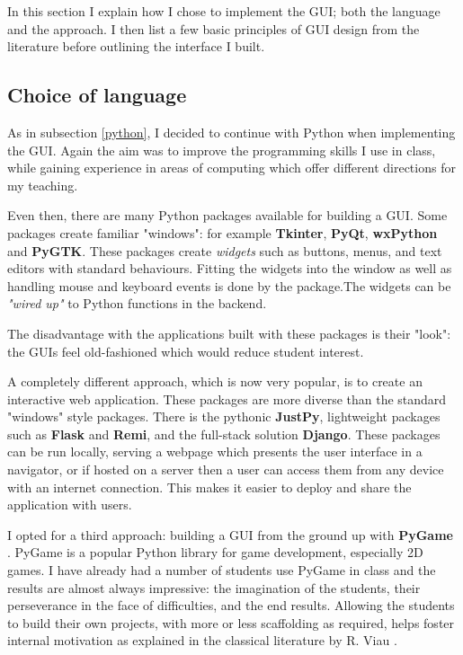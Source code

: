 \documentclass[10pt]{article}
\begin{document}
In this section I explain how I chose to implement the GUI; both the language and the approach. I then list a few basic principles of GUI design from the literature before outlining the interface I built.

\subsection{Choice of language}

As in subsection \ref{python}, I decided to continue with Python when implementing the GUI. Again the aim was to improve the programming skills I use in class, while gaining experience in areas of computing which offer different directions for my teaching.

Even then, there are many Python packages available for building a GUI. Some packages create familiar "windows": for example \textbf{Tkinter}, \textbf{PyQt}, \textbf{wxPython} and \textbf{PyGTK}. These packages create \emph{widgets} such as buttons, menus, and text editors with standard behaviours. Fitting the widgets into the window as well as handling mouse and keyboard events is done by the package.The widgets can be \emph{"wired up"} to Python functions in the backend. 

The disadvantage with the applications built with these packages is their "look": the GUIs feel old-fashioned which would reduce student interest.

A completely different approach, which is now very popular, is to create an interactive web application. These packages are more diverse than the standard "windows" style packages. There is the pythonic \textbf{JustPy}, lightweight packages such as \textbf{Flask} and \textbf{Remi}, and the full-stack solution \textbf{Django}. These packages can be run locally, serving a webpage which presents the user interface in a navigator, or if hosted on a server then a user can access them from any device with an internet connection. This makes it easier to deploy and share the application with users.

I opted for a third approach: building a GUI from the ground up with \textbf{PyGame} \cite{KK16}. PyGame is a popular Python library for game development, especially 2D games. I have already had a number of students use PyGame in class and the results are almost always impressive: the imagination of the students, their perseverance in the face of difficulties, and the end results. Allowing the students to build their own projects, with more or less scaffolding as required, helps foster internal motivation as explained in the classical literature by R. Viau \cite{Viau94}.
\end{document}
